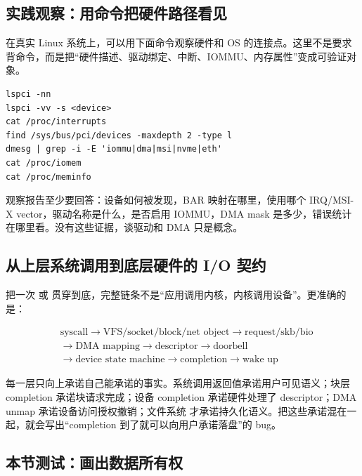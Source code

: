 \subsection{实践观察：用命令把硬件路径看见}

在真实 Linux 系统上，可以用下面命令观察硬件和 OS 的连接点。这里不是要求背命令，而是把“硬件描述、驱动绑定、中断、IOMMU、内存属性”变成可验证对象。

\begin{lstlisting}
lspci -nn
lspci -vv -s <device>
cat /proc/interrupts
find /sys/bus/pci/devices -maxdepth 2 -type l
dmesg | grep -i -E 'iommu|dma|msi|nvme|eth'
cat /proc/iomem
cat /proc/meminfo
\end{lstlisting}

观察报告至少要回答：设备如何被发现，BAR 映射在哪里，使用哪个 IRQ/MSI-X vector，驱动名称是什么，是否启用 IOMMU，DMA mask 是多少，错误统计在哪里看。没有这些证据，谈驱动和 DMA 只是概念。

\subsection{从上层系统调用到底层硬件的 I/O 契约}

把一次  或  贯穿到底，完整链条不是“应用调用内核，内核调用设备”。更准确的是：

\[
\begin{aligned}
&\text{syscall}
\rightarrow \text{VFS/socket/block/net object}
\rightarrow \text{request/skb/bio}\\
&\rightarrow \text{DMA mapping}
\rightarrow \text{descriptor}
\rightarrow \text{doorbell}\\
&\rightarrow \text{device state machine}
\rightarrow \text{completion}
\rightarrow \text{wake up}
\end{aligned}
\]

每一层只向上承诺自己能承诺的事实。系统调用返回值承诺用户可见语义；块层 completion 承诺块请求完成；设备 completion 承诺硬件处理了 descriptor；DMA unmap 承诺设备访问授权撤销；文件系统  才承诺持久化语义。把这些承诺混在一起，就会写出“completion 到了就可以向用户承诺落盘”的 bug。

\subsection{本节测试：画出数据所有权}

